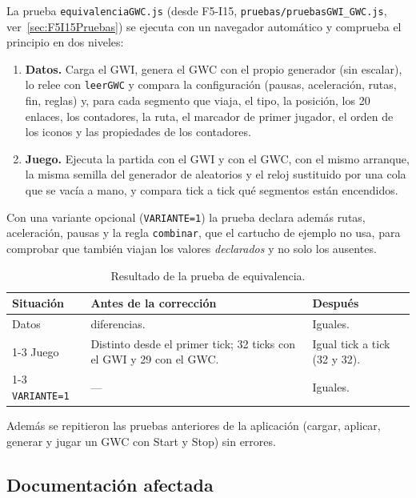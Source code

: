 La prueba \texttt{equivalenciaGWC.js} (desde F5-I15, \texttt{pruebas/pruebasGWI\_GWC.js}, ver~\ref{sec:F5I15Pruebas}) se ejecuta con un navegador automático y comprueba el principio en dos niveles:

\begin{enumerate}
	\item \textbf{Datos.} Carga el GWI, genera el GWC con el propio generador (sin escalar), lo relee con \texttt{leerGWC} y compara la configuración (pausas, aceleración, rutas, fin, reglas) y, para cada segmento que viaja, el tipo, la posición, los 20 enlaces, los contadores, la ruta, el marcador de primer jugador, el orden de los iconos y las propiedades de los contadores.
	\item \textbf{Juego.} Ejecuta la partida con el GWI y con el GWC, con el mismo arranque, la misma semilla del generador de aleatorios y el reloj sustituido por una cola que se vacía a mano, y compara tick a tick qué segmentos están encendidos.
\end{enumerate}

Con una variante opcional (\texttt{VARIANTE=1}) la prueba declara además rutas, aceleración, pausas y la regla \texttt{combinar}, que el cartucho de ejemplo no usa, para comprobar que también viajan los valores \emph{declarados} y no solo los ausentes.

\begin{table}[H]
	\centering
	\begin{tabularx}{\textwidth}{l >{\raggedright\arraybackslash}X l}
		\toprule
		\textbf{Situación} & \textbf{Antes de la corrección} & \textbf{Después} \\
		\midrule
		Datos & 9 diferencias. & Iguales. \\
		\cmidrule(lr){1-3}
		Juego & Distinto desde el primer tick; 32 ticks con el GWI y 29 con el GWC. & Igual tick a tick (32 y 32). \\
		\cmidrule(lr){1-3}
		\texttt{VARIANTE=1} & --- & Iguales. \\
		\bottomrule
	\end{tabularx}
	\caption{Resultado de la prueba de equivalencia.}
	\label{tab:prueba-equivalencia}
\end{table}


Además se repitieron las pruebas anteriores de la aplicación (cargar, aplicar, generar y jugar un GWC con Start y Stop) sin errores.

\subsection{Documentación afectada}
\label{sec:F5I13Doc}

